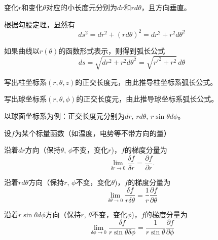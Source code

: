 \documentclass[CJK]{beamer}
\begin{document}
\begin{frame}
\bch
{}

变化$r$和变化$\theta$对应的小长度元分别为$dr$和$rd\theta$，且方向垂直。
\ech
\end{frame}


\begin{frame}
\bch
{}
根据勾股定理，显然有
$$ds^2 = dr^2 + (rd\theta)^2  = dr^2 + r^2 d\theta^2$$
\emini
{}
\emini

如果曲线以$r(\theta)$的函数形式表示，则得到弧长公式
$$ ds = \sqrt{dr^2+r^2d\theta^2} = \sqrt{r'^2+r^2 }\,d\theta$$

\ech
\end{frame}


\begin{frame}
\bch


写出柱坐标系$(r,\theta, z)$的正交长度元，由此推导柱坐标系弧长公式。

\ech
\end{frame}


\begin{frame}
\bch


写出球坐标系$(r,\theta, \phi)$的正交长度元，由此推导球坐标系弧长公式。

\ech
\end{frame}


\begin{frame}
  \bch
  以球面坐标系为例：正交长度元分别为$dr$, $rd\theta$, $r\sin\theta d\phi$。

  \skipline

  设$f$为某个标量函数（如温度，电势等不带方向的量）

  \bitem

\item{沿着$dr$方向（保持$\theta$, $\phi$不变，变化$r$)，$f$的梯度分量为
    $$\lim_{\delta r\rightarrow 0}\frac{\delta f}{\delta r} = \frac{\partial f}{\partial r}.$$}

\item{沿着$rd\theta$方向（保持$r$, $\phi$不变，变化$\theta$)，$f$的梯度分量为
  $$\lim_{\delta \theta \rightarrow 0}\frac{\delta f}{r\delta \theta} = \frac{1}{r}\frac{\partial f}{\partial \theta}$$}

\item{沿着$r\sin\theta d\phi$方向（保持$r$, $\theta$不变，变化$\phi$)，$f$的梯度分量为
  $$\lim_{\delta \phi \rightarrow 0}\frac{\delta f}{r\sin\theta \delta \phi} = \frac{1}{r\sin\theta}\frac{\partial f}{\partial \phi}$$}
  
    \eitem

  \ech
\end{frame}
\end{document}
